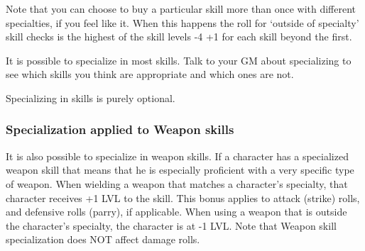 \documentclass[twoside]{book}
\begin{document}
  
    {  
    Note that you can choose to buy a particular skill
                 more than once with different specialties, if you feel
                 like it. When this happens the roll for `outside
                 of specialty' skill checks is the highest of the
                 skill levels -4 +1 for each skill beyond the first.
                 
    }
  
  

  

  
    {  
    It is possible to specialize in most skills. Talk
                 to your GM about specializing to see which skills you
                 think are appropriate and which ones are not. 
    }
  
    {  
    Specializing in skills is purely optional. 
    }
  
    

\subsubsection{Specialization applied to Weapon skills}
    
    {  
    It is also possible to specialize in weapon
                 skills. If a character has a specialized weapon skill
                 that means that he is especially proficient with a very
                 specific type of weapon. When wielding a weapon that
                 matches a character's specialty, that character
                 receives +1 LVL to the skill. This bonus applies to
                 attack (strike) rolls, and defensive rolls (parry), if
                 applicable. When using a weapon that is outside the
                 character's specialty, the character is at -1 LVL.
                 Note that Weapon skill specialization does NOT affect
                 damage rolls. 
    }
  
\end{document}
